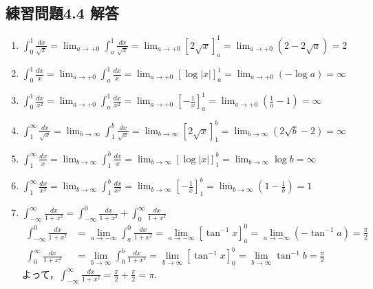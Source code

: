 \documentclass[a4paper,10pt, uplatex, dvipdfmx]{jsarticle}
\newcommand{\ds}{\displaystyle}
\begin{document}
\subsection*{練習問題4.4 解答}


\begin{enumerate}[(1)]

  \setlength{\itemsep}{1zh}
  
\item $\ds \int_{0}^{1} \frac{dx}{\sqrt{x}}= \lim_{a \to +0} \int_{a}^{1} \frac{dx}{\sqrt{x}}
  = \lim_{a \to +0} \left[ 2\sqrt{x}\right]_{a}^{1} = \lim_{a \to +0} \left( 2- 2\sqrt{a}\right) = 2$
  
\item $\ds \int_{0}^{1} \frac{dx}{x} = \lim_{a \to +0} \int_{a}^{1}\frac{dx}{x}
  =\lim_{a \to +0} \left[ \log |x| \right]_{a}^{1} = \lim_{a \to +0} \left(-\log a \right)= \infty$

\item $\ds \int_{0}^{1} \frac{dx}{x^2} = \lim_{a \to +0 }\int_{a}^{1}\frac{dx}{x^2}
  =\lim_{a \to +0} \left[ -\frac{1}{x}\right]_{a}^{1} = \lim_{a \to +0} \left( \frac{1}{a} -1\right) = \infty$

\item $\ds \int_{1}^{\infty} \frac{dx}{\sqrt{x}} = \lim_{b \to \infty} \int_{1}^{b} \frac{dx}{\sqrt{x}}
  =\lim_{b \to \infty} \left[ 2\sqrt{x} \right]_{1}^{b} = \lim_{b \to \infty} \left( 2\sqrt{b} - 2\right) = \infty$

\item $\ds \int_{1}^{\infty} \frac{dx}{x} = \lim_{b \to \infty}\int_{1}^{b}\frac{dx}{x}
  =\lim_{b \to \infty}\left[ \log|x|\right]_{1}^{b} = \lim_{b \to \infty} \log b = \infty$

\item $\ds \int_{1}^{\infty} \frac{dx}{x^2} = \lim_{b \to \infty} \int_{1}^{b}\frac{dx}{x^2}
  = \lim_{b \to \infty} \left[ -\frac{1}{x}\right]_{1}^{b} = \lim_{b \to \infty} \left( 1 - \frac{1}{b}\right) =1$

\item $\ds \int_{-\infty}^{\infty} \frac{dx}{1+x^2}
  = \int_{-\infty}^{0}\frac{dx}{1+x^2} + \int_{0}^{\infty}\frac{dx}{1+x^2}$
  \[
    \begin{aligned}
    \int_{-\infty}^{0}\frac{dx}{1+x^2} &= \lim_{a \to -\infty}\int_{a}^{0}\frac{dx}{1+x^2}
    = \lim_{a \to -\infty}\left[ \tan^{-1}x\right]_{a}^{0} = \lim_{a \to -\infty}\left(-\tan^{-1}a\right)
    = \frac{\pi}{2}\\
    \int_{0}^{\infty}\frac{dx}{1+x^2} &= \lim_{b \to \infty}\int_{0}^{b}\frac{dx}{1+x^2}
    = \lim_{b \to \infty}\left[ \tan^{-1}x\right]_{0}^{b} = \lim_{b \to \infty} \tan^{-1}b = \frac{\pi}{2}
    \end{aligned}
  \]
  よって，$\ds \int_{-\infty}^{\infty}\frac{dx}{1+x^2} = \frac{\pi}{2} + \frac{\pi}{2} = \pi$.


\end{enumerate}
\end{document}
